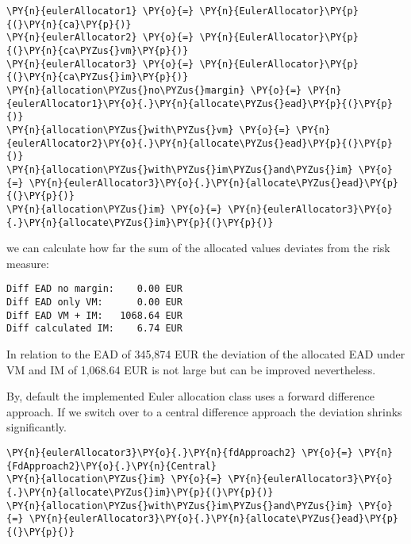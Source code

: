     \begin{tcolorbox}[breakable, size=fbox, boxrule=1pt, pad at break*=1mm,colback=cellbackground, colframe=cellborder]
\begin{Verbatim}[commandchars=\\\{\}]
\PY{n}{eulerAllocator1} \PY{o}{=} \PY{n}{EulerAllocator}\PY{p}{(}\PY{n}{ca}\PY{p}{)}
\PY{n}{eulerAllocator2} \PY{o}{=} \PY{n}{EulerAllocator}\PY{p}{(}\PY{n}{ca\PYZus{}vm}\PY{p}{)}
\PY{n}{eulerAllocator3} \PY{o}{=} \PY{n}{EulerAllocator}\PY{p}{(}\PY{n}{ca\PYZus{}im}\PY{p}{)}
\PY{n}{allocation\PYZus{}no\PYZus{}margin} \PY{o}{=} \PY{n}{eulerAllocator1}\PY{o}{.}\PY{n}{allocate\PYZus{}ead}\PY{p}{(}\PY{p}{)}
\PY{n}{allocation\PYZus{}with\PYZus{}vm} \PY{o}{=} \PY{n}{eulerAllocator2}\PY{o}{.}\PY{n}{allocate\PYZus{}ead}\PY{p}{(}\PY{p}{)}
\PY{n}{allocation\PYZus{}with\PYZus{}im\PYZus{}and\PYZus{}im} \PY{o}{=} \PY{n}{eulerAllocator3}\PY{o}{.}\PY{n}{allocate\PYZus{}ead}\PY{p}{(}\PY{p}{)}
\PY{n}{allocation\PYZus{}im} \PY{o}{=} \PY{n}{eulerAllocator3}\PY{o}{.}\PY{n}{allocate\PYZus{}im}\PY{p}{(}\PY{p}{)}
\end{Verbatim}
\end{tcolorbox}

    we can calculate how far the sum of the allocated values deviates from
the risk measure:

    \begin{Verbatim}[commandchars=\\\{\}]
Diff EAD no margin:    0.00 EUR
Diff EAD only VM:      0.00 EUR
Diff EAD VM + IM:   1068.64 EUR
Diff calculated IM:    6.74 EUR
    \end{Verbatim}

    In relation to the EAD of 345,874 EUR the deviation of the allocated EAD
under VM and IM of 1,068.64 EUR is not large but can be improved
nevertheless.

    
    By, default the implemented Euler allocation class uses a forward
difference approach. If we switch over to a central difference approach
the deviation shrinks significantly.

    \begin{tcolorbox}[breakable, size=fbox, boxrule=1pt, pad at break*=1mm,colback=cellbackground, colframe=cellborder]
\begin{Verbatim}[commandchars=\\\{\}]
\PY{n}{eulerAllocator3}\PY{o}{.}\PY{n}{fdApproach2} \PY{o}{=} \PY{n}{FdApproach2}\PY{o}{.}\PY{n}{Central}
\PY{n}{allocation\PYZus{}im} \PY{o}{=} \PY{n}{eulerAllocator3}\PY{o}{.}\PY{n}{allocate\PYZus{}im}\PY{p}{(}\PY{p}{)}
\PY{n}{allocation\PYZus{}with\PYZus{}im\PYZus{}and\PYZus{}im} \PY{o}{=} \PY{n}{eulerAllocator3}\PY{o}{.}\PY{n}{allocate\PYZus{}ead}\PY{p}{(}\PY{p}{)}
\end{Verbatim}
\end{tcolorbox}

